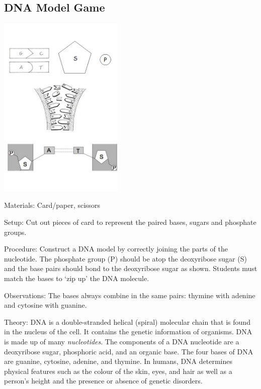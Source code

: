 \begin{multicols}{2}
\columnbreak

\subsection{DNA Model Game} %

\begin{center}
\includegraphics[width=0.45\textwidth]{./img/dna-game.jpg}
\end{center}

\begin{description*}
\item[Materials:]{Card/paper, scissors}
\item[Setup:]{Cut out pieces of card to
represent the paired bases, sugars and phosphate groups.}
\item[Procedure:]{Construct a DNA model by correctly joining the parts of the nucleotide. The phosphate group (P) should be atop the deoxyribose sugar (S) and the
base pairs should bond to the deoxyribose sugar as shown. Students must match the bases to
`zip up' the DNA molecule.}
\item[Observations:]{The bases
always combine in the same pairs:
thymine with adenine and
cytosine with guanine.}
\item[Theory:]{DNA is a double-stranded helical (spiral) molecular chain that is found in the nucleus of the cell. It contains the genetic information of organisms. DNA is made up of many \emph{nucleotides}. The components of a DNA nucleotide are a deoxyribose sugar, phosphoric acid, and an organic base. The four bases of DNA are guanine, cytosine, adenine, and thymine. In humans, DNA determines physical features such as the colour of the skin, eyes, and hair as well as a person's height and the presence or absence of genetic disorders.}
\end{description*}


\end{multicols}
